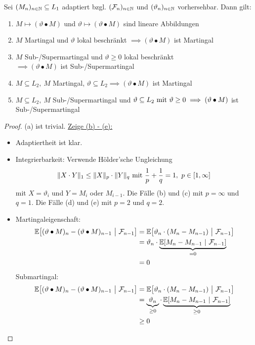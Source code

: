 \begin{theorem}\label{theorem2.5}
	Sei $(M_n)_{n\in\N}\subseteq L_1$ adaptiert bzgl. $(\F_n)_{n\in\N}$ und $(\vartheta_n)_{n\in\N}$ vorhersehbar. Dann gilt:

	\begin{enumerate}[label=(\alph*)]
		\item $M\mapsto(\vartheta\bullet M)$ und $\vartheta\mapsto(\vartheta\bullet M)$ sind lineare Abbildungen
		\item $M$ Martingal und $\vartheta$ lokal beschränkt $\implies(\vartheta\bullet M)$ ist Martingal
		\item $M$ Sub-/Supermartingal und $\vartheta\geq0$ lokal beschränkt\\ $\implies(\vartheta\bullet M)$ ist Sub-/Supermartingal
		\item $M\subseteq L_2,~M$ Martingal, $\vartheta\subseteq L_2\implies(\vartheta\bullet M)$ ist Martingal
		\item $M\subseteq L_2,~M$ Sub-/Supermartingal und $\vartheta\subseteq L_2\mit\vartheta\geq0\\\implies(\vartheta\bullet M)$ ist Sub-/Supermartingal
	\end{enumerate}
\end{theorem}

\begin{proof}
	(a) ist trivial.\nl
	\underline{Zeige (b) - (e):}
	\begin{itemize}
		\item Adaptiertheit ist klar.
		\item Integrierbarkeit: Verwende Hölder'sche Ungleichung
		\begin{align*}
			\Vert X\cdot Y\Vert_1\leq\Vert X\Vert_p\cdot\Vert Y\Vert_q\mit\frac{1}{p}+\frac{1}{q}=1,~p\in[1,\infty]
		\end{align*}
		mit $X=\vartheta_i$ und $Y=M_i$ oder $M_{i-1}$. Die Fälle (b) und (c) mit $p=\infty$ und $q=1$. Die Fälle (d) und (e) mit $p=2$ und $q=2$.
		\item Martingaleigenschaft:
		\begin{align*}
			\E\big[(\vartheta\bullet M)_n-(\vartheta\bullet M)_{n-1}~\big|~\F_{n-1}\big]
			&=\E\big[\vartheta_n\cdot(M_n-M_{n-1})~\big|~\F_{n-1}\big]\\
			&=\vartheta_n\cdot\underbrace{\E[M_n-M_{n-1}~|~\F_{n-1}]}_{=0}\\
			&=0
		\end{align*}
		Submartingal:
		\begin{align*}
			\E\big[(\vartheta\bullet M)_n-(\vartheta\bullet M)_{n-1}~\big|~\F_{n-1}\big]
			&=\E\big[\vartheta_n\cdot(M_n-M_{n-1})~\big|~\F_{n-1}\big]\\
			&=\underbrace{\vartheta_n}_{\geq0}\cdot\underbrace{\E[M_n-M_{n-1}~|~\F_{n-1}]}_{\geq0}\\
			&\geq0
		\end{align*}
	\end{itemize}
\end{proof}

